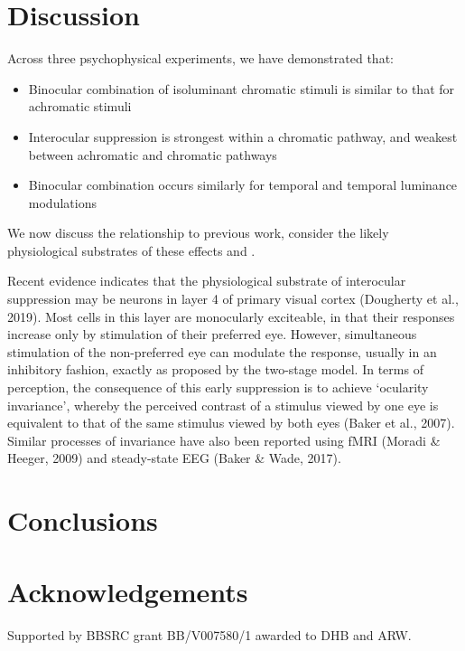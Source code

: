 \documentclass[
]{article}
\providecommand{\tightlist}{%
  \setlength{\itemsep}{0pt}\setlength{\parskip}{0pt}}
\begin{document}
\hypertarget{discussion}{%
\section{Discussion}\label{discussion}}

Across three psychophysical experiments, we have demonstrated that:

\begin{itemize}
\tightlist
\item
  Binocular combination of isoluminant chromatic stimuli is similar to that for achromatic stimuli
\item
  Interocular suppression is strongest within a chromatic pathway, and weakest between achromatic and chromatic pathways
\item
  Binocular combination occurs similarly for temporal and temporal luminance modulations
\end{itemize}

We now discuss the relationship to previous work, consider the likely physiological substrates of these effects and .

Recent evidence indicates that the physiological substrate of interocular suppression may be neurons in layer 4 of primary visual cortex (Dougherty et al., 2019). Most cells in this layer are monocularly exciteable, in that their responses increase only by stimulation of their preferred eye. However, simultaneous stimulation of the non-preferred eye can modulate the response, usually in an inhibitory fashion, exactly as proposed by the two-stage model. In terms of perception, the consequence of this early suppression is to achieve `ocularity invariance', whereby the perceived contrast of a stimulus viewed by one eye is equivalent to that of the same stimulus viewed by both eyes (Baker et al., 2007). Similar processes of invariance have also been reported using fMRI (Moradi \& Heeger, 2009) and steady-state EEG (Baker \& Wade, 2017).

\hypertarget{conclusions}{%
\section{Conclusions}\label{conclusions}}

\hypertarget{acknowledgements}{%
\section{Acknowledgements}\label{acknowledgements}}

Supported by BBSRC grant BB/V007580/1 awarded to DHB and ARW.
\end{document}
